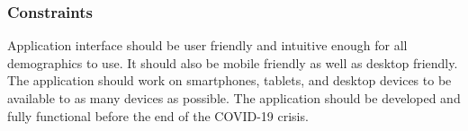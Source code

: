 \subsubsection{Constraints}

Application interface should be user friendly and intuitive enough for all demographics to use.
It should also be mobile friendly as well as desktop friendly.
The application should work on smartphones, tablets, and desktop devices to be available to as many devices as possible.
The application should be developed and fully functional before the end of the COVID-19 crisis.

